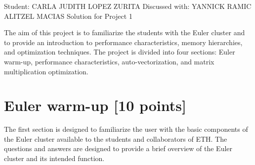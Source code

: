 \documentclass[unicode,11pt,a4paper,oneside,numbers=endperiod,openany]{scrartcl}
\begin{document}
\setassignment
{}

            {Student: CARLA JUDITH LOPEZ ZURITA}
            {Discussed with: YANNICK RAMIC \\
            \hspace*{370pt}ALITZEL MACIAS}
{Solution for Project 1}{}
\newline

The aim of this project is to familiarize the students with the Euler cluster and to provide an
introduction to performance characteristics, memory hierarchies, and optimization techniques. The
project is divided into four sections: Euler warm-up, performance characteristics, auto-vectorization,
and matrix multiplication optimization.

\section{Euler warm-up [10 points]}

The first section is designed to familiarize the user with the basic components of the Euler cluster
available to the students and collaborators of ETH. The questions and answers are designed to
provide a brief overview of the Euler cluster and its intended function.
\end{document}
